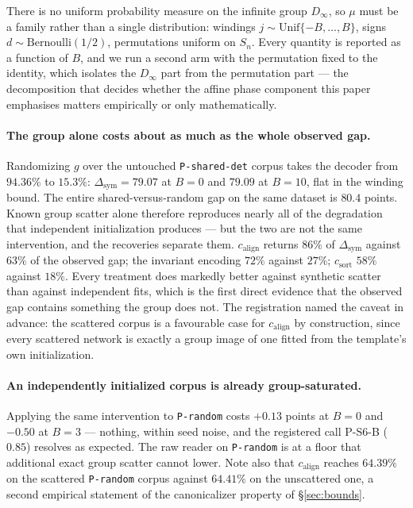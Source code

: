 \documentclass[10pt,letterpaper]{article}
\theoremstyle{definition}
\newcommand{\Dinf}{D_\infty}
\newcommand{\csort}{c_{\mathrm{sort}}}
\newcommand{\calign}{c_{\mathrm{align}}}
\begin{document}
There is no uniform probability measure on the infinite group $\Dinf$, so $\mu$ must be a family
rather than a single distribution: windings $j \sim \mathrm{Unif}\{-B,\dots,B\}$, signs
$d \sim \mathrm{Bernoulli}(1/2)$, permutations uniform on $S_n$. Every quantity is reported as a
function of $B$, and we run a second arm with the permutation fixed to the identity, which isolates
the $\Dinf$ part from the permutation part --- the decomposition that decides whether the affine
phase component this paper emphasises matters empirically or only mathematically.



\paragraph{The group alone costs about as much as the whole observed gap.} Randomizing $g$ over the
untouched \texttt{P-shared-det} corpus takes the decoder from $94.36\%$ to $15.3\%$:
$\Delta_{\mathrm{sym}} = 79.07$ at $B=0$ and $79.09$ at $B=10$, flat in the winding bound. The
entire shared-versus-random gap on the same dataset is $80.4$ points. Known group scatter alone
therefore reproduces nearly all of the degradation that independent initialization produces --- but
the two are not the same intervention, and the recoveries separate them. $\calign$ returns $86\%$ of
$\Delta_{\mathrm{sym}}$ against $63\%$ of the observed gap; the invariant encoding $72\%$ against
$27\%$; $\csort$ $58\%$ against $18\%$. Every treatment does markedly better against synthetic
scatter than against independent fits, which is the first direct evidence that the observed gap
contains something the group does not. The registration named the caveat in advance: the scattered
corpus is a favourable case for $\calign$ by construction, since every scattered network is exactly
a group image of one fitted from the template's own initialization.

\paragraph{An independently initialized corpus is already group-saturated.} Applying the same
intervention to \texttt{P-random} costs $+0.13$ points at $B=0$ and $-0.50$ at $B=3$ --- nothing,
within seed noise, and the registered call P-S6-B ($0.85$) resolves as expected. The raw reader on
\texttt{P-random} is at a floor that additional exact group scatter cannot lower. Note also that
$\calign$ reaches $64.39\%$ on the scattered \texttt{P-random} corpus against $64.41\%$ on the
unscattered one, a second empirical statement of the canonicalizer property of \S\ref{sec:bounds}.
\end{document}
